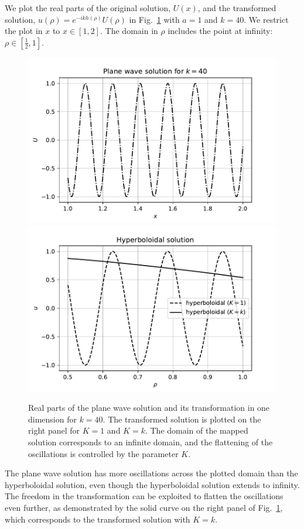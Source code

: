 \documentclass[draft,onefignum,onetabnum]{siamart190516}
\begin{document}
We plot the real parts of the original solution, $U(x)$, and the transformed solution, $u(\rho)=e^{-ikh(\rho)}U(\rho)$ in Fig.~\ref{fig:oned} with $a=1$ and $k=40$. We restrict the plot in $x$ to $x\in[1,2]$. The domain in $\rho$ includes the point at infinity: $\rho\in[\tfrac{1}{2},1]$.
\begin{figure}[tbhp]
	\centering
	\includegraphics[scale=0.4]{figs/st_oned}
	\includegraphics[scale=0.4]{figs/hyp_oned.pdf}
	\caption{Real parts of the plane wave solution and its transformation in one dimension for $k=40$. The transformed solution is plotted on the right panel for $K=1$ and $K=k$. The domain of the mapped solution corresponds to an infinite domain, and the flattening of the oscillations is controlled by the parameter $K$.}
	\label{fig:oned}
\end{figure}

The plane wave solution has more oscillations across the plotted domain than the hyperboloidal solution, even though the hyperboloidal solution extends to infinity. The freedom in the transformation can be exploited to flatten the oscillations even further, as demonstrated by the solid curve on the right panel of Fig.~\ref{fig:oned}, which corresponds to the transformed solution with $K=k$.
\end{document}
